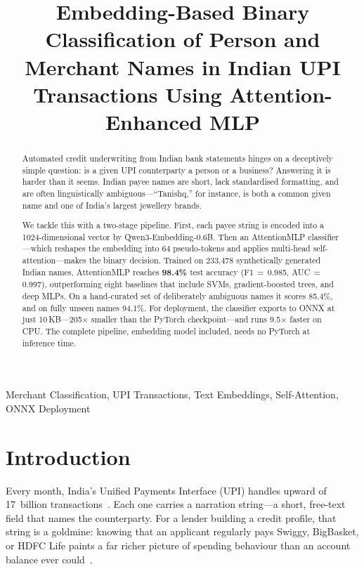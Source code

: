 \documentclass[conference]{IEEEtran}
\begin{document}
\title{Embedding-Based Binary Classification of Person and
Merchant Names in Indian UPI Transactions Using
Attention-Enhanced MLP}

\author{
  \IEEEauthorblockN{[Authors]}
}

\maketitle

\begin{abstract}
Automated credit underwriting from Indian bank statements hinges on a deceptively simple question: is a given UPI counterparty a person or a business? Answering it is harder than it seems. Indian payee names are short, lack standardised formatting, and are often linguistically ambiguous---``Tanishq,'' for instance, is both a common given name and one of India's largest jewellery brands.

We tackle this with a two-stage pipeline. First, each payee string is encoded into a 1024-dimensional vector by Qwen3-Embedding-0.6B. Then an AttentionMLP classifier---which reshapes the embedding into 64 pseudo-tokens and applies multi-head self-attention---makes the binary decision. Trained on 233{,}478 synthetically generated Indian names, AttentionMLP reaches \textbf{98.4\%} test accuracy (F1\,$=$\,0.985, AUC\,$=$\,0.997), outperforming eight baselines that include SVMs, gradient-boosted trees, and deep MLPs. On a hand-curated set of deliberately ambiguous names it scores 85.4\%, and on fully unseen names 94.1\%. For deployment, the classifier exports to ONNX at just 10\,KB---205$\times$ smaller than the PyTorch checkpoint---and runs 9.5$\times$ faster on CPU. The complete pipeline, embedding model included, needs no PyTorch at inference time.
\end{abstract}

\begin{IEEEkeywords}
Merchant Classification, UPI Transactions, Text Embeddings, Self-Attention, ONNX Deployment
\end{IEEEkeywords}

\section{Introduction}
\label{sec:intro}

Every month, India's Unified Payments Interface (UPI) handles upward of 17~billion transactions~\cite{rbi2025vision}. Each one carries a narration string---a short, free-text field that names the counterparty. For a lender building a credit profile, that string is a goldmine: knowing that an applicant regularly pays Swiggy, BigBasket, or HDFC Life paints a far richer picture of spending behaviour than an account balance ever could~\cite{byanjankar2021predicting}.
\end{document}
